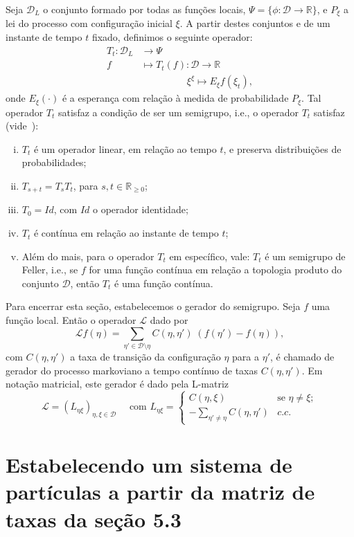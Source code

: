 \documentclass[twoside,openright,titlepage,numbers=noenddot,headinclude,  lineheaders footinclude=true,cleardoublepage=empty,
                                BCOR=5mm,paper=a4,fontsize=12pt ]{scrbook}
\theoremstyle{definition}
\begin{document}
Seja $\mathscr{D}_L$ o conjunto formado por todas as funções locais,
$\Psi = \{\phi: \mathscr{D} \rightarrow \mathbb{R}\}$, e $P_{\xi}$
a lei do processo com configuração inicial $\xi$.
A partir destes
conjuntos e de um instante de tempo $t$ fixado, definimos o seguinte
operador:
\begin{align*}
T_t: \mathscr{D}_L  & \rightarrow \Psi \\
   f & \mapsto T_t(f): \mathscr{D}  \rightarrow \mathbb{R}\\
     &  \qquad \qquad  \; \; \, \xi^{\xi} \mapsto E_{\xi} f(\xi_t),
\end{align*}
onde $E_{\xi}(\cdot)$ é a esperança com relação à medida de probabilidade $P_{\xi}$.
Tal operador $T_t$ satisfaz a condição de ser um semigrupo, i.e.,
o operador $T_t$ satisfaz (vide~\cite{noether}):
\begin{enumerate}[(i)]
\item $T_t$ é um operador linear, em relação ao tempo $t$, e preserva
distribuições de probabilidades;
\item $T_{s+t} = T_s T_t$, para $s, t \in \mathbb{R}_{\geq 0}$;
\item $T_0 = Id$, com $Id$ o operador identidade;
\item $T_t$ é contínua em relação ao instante de tempo $t$;
\item  Além do mais, para o operador $T_t$ em específico, vale:
$T_t$ é um semigrupo de Feller, i.e., se $f$ for uma função
contínua em relação a topologia produto do conjunto $\mathscr{D}$,
então $T_t$ é uma função contínua.
\end{enumerate}

Para encerrar esta seção, estabelecemos o gerador do semigrupo. Seja $f$ uma 
função local. Então o operador $\mathscr{L}$ dado por
\[
\mathscr{L}f(\eta) = \sum_{ \eta' \in \mathscr{D}\setminus{\eta} } C(\eta, \eta')\; ( f(\eta') - f(\eta) ),
\]
com $C(\eta, \eta')$ a taxa de transição da configuração $\eta$ para a $\eta'$, é chamado de gerador
do processo markoviano a tempo contínuo de taxas $C(\eta, \eta')$. Em notação matricial, este gerador é dado pela L-matriz
\[
\bm{\mathscr{L}} = (L_{\eta \xi})_{\eta, \xi \in \mathscr{D}} \quad \text{ com } 
L_{\eta \xi} = 
\begin{cases}
C(\eta, \xi) & \text{se } \eta \neq \xi;\\
-\sum_{\eta' \neq \eta} C(\eta, \eta') & c.c.
\end{cases}
\]


\section {Estabelecendo um sistema de part\'iculas a partir da matriz de taxas da se\c{c}\~ao 5.3}
\label{sec:Npart}
\end{document}
